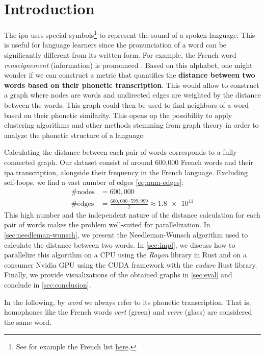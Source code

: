 \section{Introduction}

The \gls{ipa} uses special symbols\footnote{See for example the French list \href{https://en.wikipedia.org/wiki/Help:IPA/French}{here}.} to represent the sound of a spoken language. This is useful for language learners since the pronunciation of a word can be significantly different from its written form. For example, the French word \textit{renseignement} (information) is pronounced . Based on this alphabet, one might wonder if we can construct a metric that quantifies the \textbf{distance between two words based on their phonetic transcription}. This would allow to construct a graph where nodes are words and undirected edges are weighted by the distance between the words. This graph could then be used to find neighbors of a word based on their phonetic similarity. This opens up the possibility to apply clustering algorithms and other methods stemming from graph theory in order to analyze the phonetic structure of a language.

Calculating the distance between each pair of words corresponds to a fully-connected graph. Our dataset consist of around 600,000 French words and their \gls{ipa} transcription, alongside their frequency in the French language. Excluding self-loops, we find a vast number of edges \eqref{eq:num-edges}:
\begin{align}
    \text{\#nodes} &= 600,000 \\
    \text{\#edges} &= \frac{600,000 \cdot 599,999}{2} \approx \num{1.8e11}
\end{align}
This high number and the independent nature of the distance calculation for each pair of words makes the problem well-suited for parallelization. In \autoref{sec:needleman-wunsch}, we present the Needleman-Wunsch algorithm used to calculate the distance between two words. In \autoref{sec:impl}, we discuss how to parallelize this algorithm on a CPU using the \textit{Rayon} library in Rust and on a consumer Nvidia GPU using the CUDA framework with the \textit{cudarc} Rust library. Finally, we provide visualizations of the obtained graphs in \ref{sec:eval} and conclude in \autoref{sec:conclusion}.

In the following, by \textit{word} we always refer to its phonetic transcription. That is, homophones like the French words \textit{vert}  (green) and \textit{verre}  (glass) are considered the same word.

